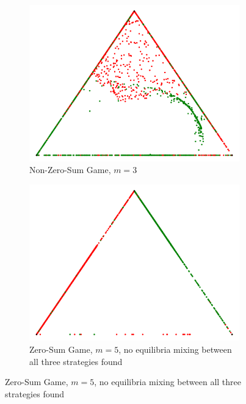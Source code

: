 \documentclass[a4paper,DIV=11,abstracton,twoside=semi]{scrreprt}
\theoremstyle{definition}
\begin{document}
\begin{figure}[h]
        \begin{subfigure}[t]{0.49\textwidth}
            \includegraphics[width=\textwidth]{Pictures/paretoNash-bimatrix-k3}
            \caption{Non-Zero-Sum Game, $m=3$}
        \end{subfigure}
        \begin{subfigure}[t]{0.49\textwidth}
            \includegraphics[width=\textwidth]{Pictures/paretoNash-emptyCenter-k5}
            \caption{Zero-Sum Game, $m=5$, no equilibria mixing between all three strategies found}
        \end{subfigure}
%        

\end{figure}
\end{document}
